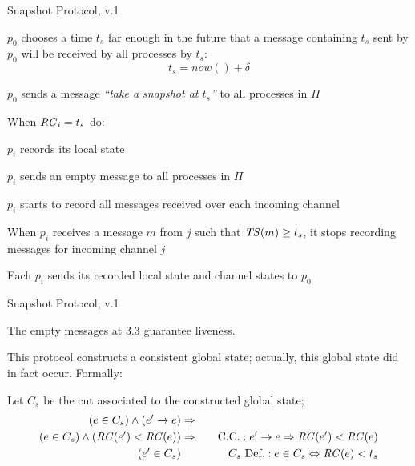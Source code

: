 \begin{frame}{Snapshot Protocol, v.1}

\BEL
\item $p_0$ chooses a time $t_s$ far enough in the future that a message containing $t_s$
  sent by $p_0$ will be received by all processes by $t_s$:
  \[
     t_s = now() + \delta
  \]
\item $p_0$ sends a message \emph{``take a snapshot at $t_s$''} to all processes in $\Pi$
\item When $\mathit{RC}_i=t_s$ do:
  \BE
  \item $p_i$ records its local state
  \item $p_i$ sends an empty message to all processes in $\Pi$
  \item $p_i$ starts to record all messages received over each incoming channel
  \EE
\item When $p_i$ receives a message $m$ from $j$ such that $\mathit{TS}(m) \geq t_s$, it stops recording
  messages for incoming channel $j$
\item Each $p_i$ sends its recorded local state and channel states to $p_0$
\EEL

\end{frame}

\begin{frame}{Snapshot Protocol, v.1}
	
 The empty messages at 3.3 guarantee liveness.

 This protocol constructs a consistent global state;
  actually, this global state did in fact occur. Formally:

Let $C_s$ be the cut associated to the constructed global state;
\begin{eqnarray*}
(e \in C_s) \wedge (e' \rightarrow e) &\Rightarrow& \\
(e \in C_s) \wedge (\mathit{RC}(e') < \mathit{RC}(e)) &\Rightarrow& \quad \mbox{C.C.}:  e' \rightarrow e  \Rightarrow \mathit{RC}(e') < \mathit{RC}(e) \\
(e' \in C_s) && \quad C_s\ \mbox{Def.}: e \in C_s \Leftrightarrow \mathit{RC}(e) < t_s 
\end{eqnarray*}

~

\end{frame}

